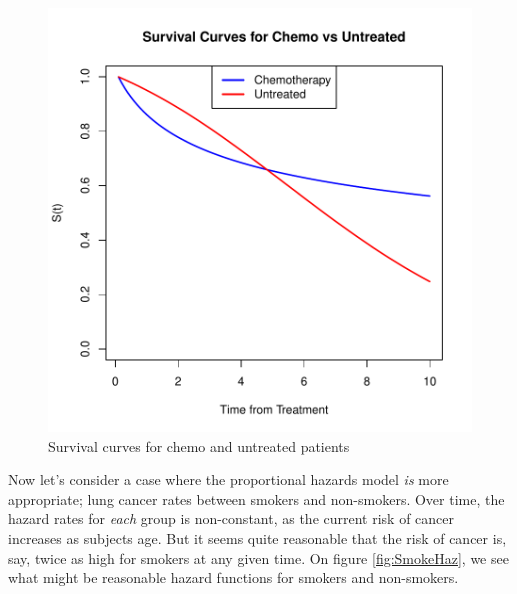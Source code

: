 \documentclass[a4paper]{article}
\begin{document}
\begin{figure}[H]
\begin{center}
\includegraphics{StatisticalBackground-007}
\caption{Survival curves for chemo and untreated patients}
\label{fig:ChemoSurv}
\end{center}
\end{figure}

  Now let's consider a case where the proportional hazards model \emph{is}  more appropriate; lung cancer rates between smokers and non-smokers. Over time, the hazard rates for \emph{each} group is non-constant, as the current risk of cancer increases as subjects age. But it seems quite reasonable that the risk of cancer is, say, twice as high for smokers at any given time. On figure \ref{fig:SmokeHaz}, we see what might be reasonable hazard functions for smokers and non-smokers. 
\end{document}
